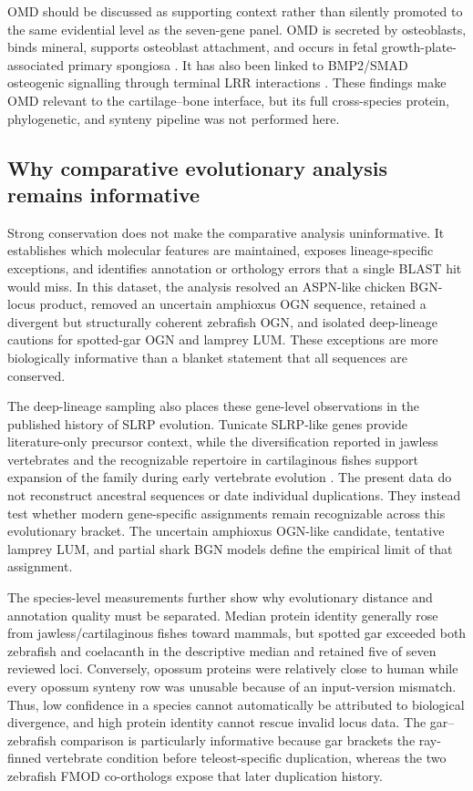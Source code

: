 OMD should be discussed as supporting context rather than silently promoted to
the same evidential level as the seven-gene panel. OMD is secreted by osteoblasts,
binds mineral, supports osteoblast attachment, and occurs in fetal
growth-plate-associated primary spongiosa \citep{Sommarin1998}. It has also been
linked to BMP2/SMAD osteogenic signalling through terminal LRR interactions
\citep{Lin2021OMD}. These findings make OMD relevant to the cartilage--bone
interface, but its full cross-species protein, phylogenetic, and synteny pipeline
was not performed here.

\subsection{Why comparative evolutionary analysis remains informative}
\label{subsec:discussion-evolution-orthology}

Strong conservation does not make the comparative analysis uninformative. It
establishes which molecular features are maintained, exposes lineage-specific
exceptions, and identifies annotation or orthology errors that a single BLAST
hit would miss. In this dataset, the analysis resolved an ASPN-like chicken
BGN-locus product, removed an uncertain amphioxus OGN sequence, retained a
divergent but structurally coherent zebrafish OGN, and isolated deep-lineage
cautions for spotted-gar OGN and lamprey LUM. These exceptions are more
biologically informative than a blanket statement that all sequences are
conserved.

The deep-lineage sampling also places these gene-level observations in the
published history of SLRP evolution. Tunicate SLRP-like genes provide
literature-only precursor context, while the diversification reported in
jawless vertebrates and the recognizable repertoire in cartilaginous fishes
support expansion of the family during early vertebrate evolution
\citep{Park2008,Costa2018}. The present data do not reconstruct ancestral
sequences or date individual duplications. They instead test whether modern
gene-specific assignments remain recognizable across this evolutionary
bracket. The uncertain amphioxus OGN-like candidate, tentative lamprey LUM, and
partial shark BGN models define the empirical limit of that assignment.

The species-level measurements further show why evolutionary distance and
annotation quality must be separated. Median protein identity generally rose
from jawless/cartilaginous fishes toward mammals, but spotted gar exceeded both
zebrafish and coelacanth in the descriptive median and retained five of seven
reviewed loci. Conversely, opossum proteins were relatively close to human
while every opossum synteny row was unusable because of an input-version
mismatch. Thus, low confidence in a species cannot automatically be attributed
to biological divergence, and high protein identity cannot rescue invalid
locus data. The gar--zebrafish comparison is particularly informative because
gar brackets the ray-finned vertebrate condition before teleost-specific
duplication, whereas the two zebrafish FMOD co-orthologs expose that later
duplication history.

